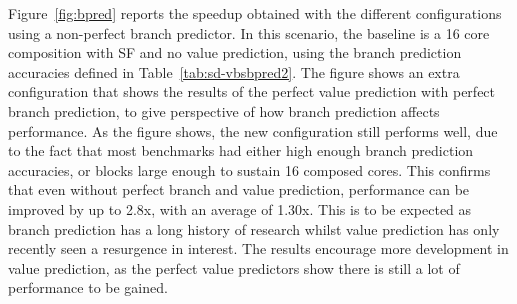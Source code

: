 Figure~\ref{fig:bpred} reports the speedup obtained with the different configurations using a non-perfect branch predictor.
In this scenario, the baseline is a 16 core composition with SF and no value prediction, using the branch prediction accuracies defined in Table~\ref{tab:sd-vbsbpred2}.
The figure shows an extra configuration that shows the results of the perfect value prediction with perfect branch prediction, to give perspective of how branch prediction affects performance.
As the figure shows, the new configuration still performs well, due to the fact that most benchmarks had either high enough branch prediction accuracies, or blocks large enough to sustain 16 composed cores.
This confirms that even without perfect branch and value prediction, performance can be improved by up to 2.8x, with an average of 1.30x.
This is to be expected as branch prediction has a long history of research whilst value prediction has only recently seen a resurgence in interest.
The results encourage more development in value prediction, as the perfect value predictors show there is still a lot of performance to be gained.





